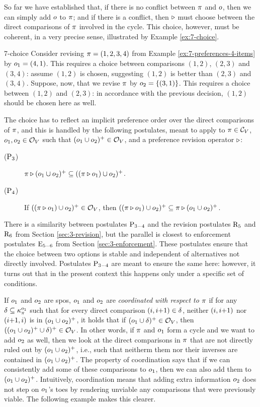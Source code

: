 So far we have established that, if there is no conflict between $\pi$ and $o$,
then we can simply add $o$ to $\pi$; and if there is a conflict, then $\triangleright$ must choose
between the direct comparisons of $\pi$ involved in the cycle.
This choice, however, must be coherent, in a very precise sense, 
illustrated by Example \ref{ex:7-choice}.

\begin{xmpl}{}{7-choice}
	Consider revising $\pi=(1,2,3,4)$ from 
	Example \ref{ex:7-preferences-4-items} by $o_1=(4,1)$.
	This requires a choice between comparisons $(1,2)$, $(2,3)$ and $(3,4)$:
	assume $(1,2)$ is chosen, suggesting $(1,2)$ is better than $(2,3)$ and $(3,4)$. 
	Suppose, now, that we revise $\pi$ by $o_2=\{(3,1)\}$. This requires a choice
	between $(1,2)$ and $(2,3)$: 
	in accordance with the previous decision, $(1,2)$ should be chosen 
	here as well.
\end{xmpl}

The choice has to reflect an implicit preference order over the direct comparisons of $\pi$,
and this is handled by the following postulates, meant to apply to $\pi\in\mathcal{C}_V$, $o_1,o_2\in\mathcal{O}_V$
such that $(o_1\cup o_2)^+\in\mathcal{O}_V$,
and a preference revision operator $\triangleright$:

\begin{description}
	\item[($\mathrm{P}_{3}$)] $\pi\triangleright(o_1\cup o_2)^+\subseteq((\pi\triangleright o_1)\cup o_2)^+$.
	\item[($\mathrm{P}_{4}$)] If $((\pi\triangleright o_1)\cup o_2)^+\in\mathcal{O}_V$, then $((\pi\triangleright o_1)\cup o_2)^+\subseteq \pi\triangleright(o_1\cup o_2)^+$.
\end{description}

There is a similarity between postulates $\mathrm{P}_{3-4}$ and the revision postulates 
$\mathrm{R}_{5}$ and $\mathrm{R}_{6}$ from Section \ref{sec:3-revision},
but the parallel is closest to enforcement postulates $\mathrm{E}_{5-6}$ from Section \ref{sec:3-enforcement}.
These postulates ensure that the choice between two options is stable and independent of alternatives 
not directly involved. Postulates $\mathrm{P}_{3-4}$ are meant to ensure the same here:
however, it turns out that in the present context
this happens only under a specific set of conditions.

If $o_1$ and $o_2$ are spos,
$o_1$ and $o_2$ are \emph{coordinated with respect to $\pi$} 
if for any $\delta\subseteq\kappa_{\pi}^{o_1}$
such that for every direct comparison $(i,{i}{+}{1})\in\delta$, 
neither $(i,{i}{+}{1})$ nor $({i}{+}{1},i)$ is in $(o_1\cup o_2)^+$, 
it holds that if $(o_1\cup\delta)^+\in\mathcal{O}_V$,
then $((o_1\cup o_2)^+\cup\delta)^+\in\mathcal{O}_V$.
In other words, if $\pi$ and $o_1$ form a cycle
and we want to add $o_2$ as well,
then we look at the direct comparisons in $\pi$
that are not directly ruled out by $(o_1\cup o_2)^+$,
i.e., such that neitherm them nor their inverses are 
contained in $(o_1\cup o_2)^+$.
The property of coordination says that 
if we can consistently add some of these 
comparisons to $o_1$,
then we can also add them to $(o_1\cup o_2)^+$. 
Intuitively, coordination means that adding
extra information $o_2$ does not step on $o_1$'s toes 
by rendering unviable any
comparisons that were previously viable.
The following example makes this clearer.

